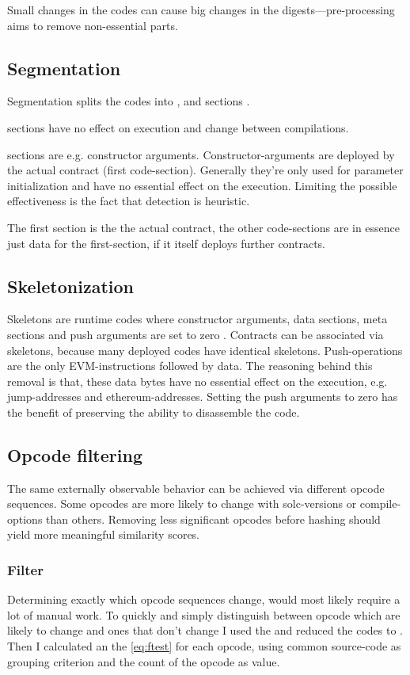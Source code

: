 \documentclass[../main.tex]{subfiles}
\begin{document}
Small changes in the codes can cause big changes in the digests---pre-processing aims to remove non-essential parts.

\subsection{Segmentation \label{sec:seg}}
Segmentation splits the codes into ,  and  sections \cite{ethutils}.

 sections have no effect on execution and change between compilations.

 sections are e.g. constructor arguments.
Constructor-arguments are deployed by the actual contract (first code-section).
Generally they're only used for parameter initialization and have no essential effect on the execution.
Limiting the possible effectiveness is the fact that detection is heuristic.

The first  section is the the actual contract, the other code-sections are in essence just data for the first-section, if it itself deploys further contracts.

\subsection{Skeletonization \label{sec:skel}}
Skeletons are runtime codes where constructor arguments, data sections, meta sections and push arguments are set to zero \cite{ethutils}.
Contracts can be associated via skeletons, because many deployed codes have identical skeletons.
Push-operations are the only EVM-instructions followed by data.
The reasoning behind this removal is that, these data bytes have no essential effect on the execution, e.g. jump-addresses and ethereum-addresses.
Setting the push arguments to zero has the benefit of preserving the ability to disassemble the code.

\subsection{Opcode filtering}
The same externally observable behavior can be achieved via different opcode sequences.
Some opcodes are more likely to change with solc-versions or compile-options than others.
Removing less significant opcodes before hashing should yield more meaningful similarity scores.

\subsubsection{ Filter \label{sec:fStat}}
Determining exactly which opcode sequences change, would most likely require a lot of manual work.
To quickly and simply distinguish between opcode which are likely to change and ones that don't change I used the \n{\solcts}  and reduced the codes to  . Then I calculated an the  \eqref{eq:ftest} for each opcode, using common source-code as grouping criterion and the count of the opcode as value.
\end{document}
